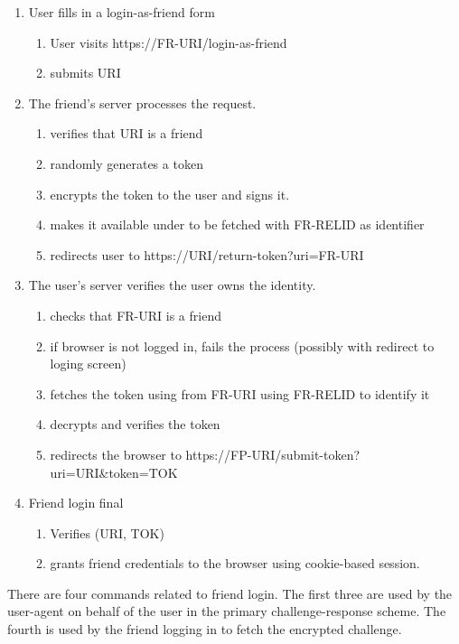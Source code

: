 \documentclass[letterpaper,11pt,oneside]{article}
\begin{document}
\begin{enumerate}
\item User fills in a login-as-friend form
    \begin{enumerate}
    \item User visits https://FR-URI/login-as-friend
    \item submits URI
    \end{enumerate}

\item The friend's server processes the request.
    \begin{enumerate}
    \item verifies that URI is a friend
    \item randomly generates a token
    \item encrypts the token to the user and signs it.
    \item makes it available under to be fetched with FR-RELID as identifier
    \item redirects user to https://URI/return-token?uri=FR-URI
    \end{enumerate}

\item  The user's server verifies the user owns the identity.
    \begin{enumerate}
    \item checks that FR-URI is a friend
    \item if browser is not logged in, fails the process
            (possibly with redirect to loging screen)
    \item fetches the token using from FR-URI using FR-RELID to identify it
    \item decrypts and verifies the token
    \item redirects the browser to https://FP-URI/submit-token?uri=URI\&token=TOK
    \end{enumerate}

\item Friend login final
    \begin{enumerate}
    \item Verifies (URI, TOK)
    \item grants friend credentials to the browser using cookie-based session.
    \end{enumerate}
\end{enumerate}

There are four commands related to friend login. The first three are used by
the user-agent on behalf of the user in the primary challenge-response scheme.
The fourth is used by the friend logging in to fetch the encrypted challenge.
\end{document}
